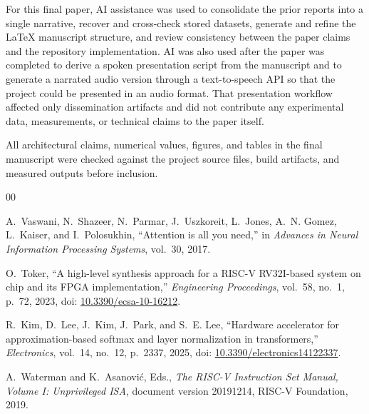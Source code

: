 \documentclass[conference]{IEEEtran}
\begin{document}
For this final paper, AI assistance was used to consolidate the prior reports into a single narrative, recover and cross-check stored datasets, generate and refine the \LaTeX{} manuscript structure, and review consistency between the paper claims and the repository implementation. AI was also used after the paper was completed to derive a spoken presentation script from the manuscript and to generate a narrated audio version through a text-to-speech API so that the project could be presented in an audio format. That presentation workflow affected only dissemination artifacts and did not contribute any experimental data, measurements, or technical claims to the paper itself.

All architectural claims, numerical values, figures, and tables in the final manuscript were checked against the project source files, build artifacts, and measured outputs before inclusion.

\FloatBarrier
\balance

\begin{thebibliography}{00}

A.~Vaswani, N.~Shazeer, N.~Parmar, J.~Uszkoreit, L.~Jones, A.~N. Gomez,
L.~Kaiser, and I.~Polosukhin, ``Attention is all you need,'' in \emph{Advances in Neural Information Processing Systems}, vol.~30, 2017.

O.~Toker, ``A high-level synthesis approach for a RISC-V RV32I-based system on chip and its FPGA implementation,'' \emph{Engineering Proceedings}, vol.~58, no.~1, p.~72, 2023, doi: \href{https://doi.org/10.3390/ecsa-10-16212}{10.3390/ecsa-10-16212}.

R.~Kim, D.~Lee, J.~Kim, J.~Park, and S.~E. Lee, ``Hardware accelerator for approximation-based softmax and layer normalization in transformers,'' \emph{Electronics}, vol.~14, no.~12, p.~2337, 2025, doi: \href{https://doi.org/10.3390/electronics14122337}{10.3390/electronics14122337}.

A.~Waterman and K.~Asanovi\'c, Eds., \emph{The RISC-V Instruction Set Manual, Volume I: Unprivileged ISA}, document version 20191214, RISC-V Foundation, 2019.

\end{thebibliography}
\end{document}
